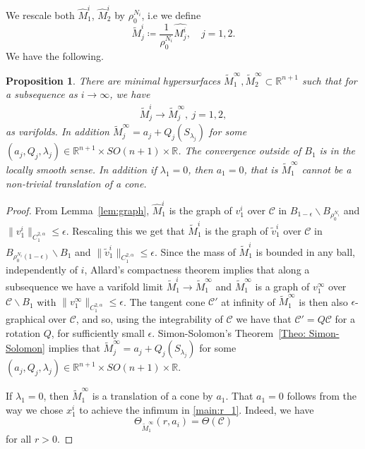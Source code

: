 \documentclass[12pt, reqno ]{amsart}
\newtheorem{prop}[theorem]{Proposition}
\numberwithin{equation}{section}
\begin{document}
We rescale both $\hat M_1^i$, $\hat M_2^i$ by $\rho_0^{N_i}$, i.e we define
$$ \widetilde M_j^i\coloneqq\frac{1}{\rho_0^{N_i}}\hat{M_j^i}, \quad j=1, 2. $$
We have the following. 
\begin{prop}\label{prop:Milimit} There are minimal hypersurfaces $\widetilde M_1^\infty, \widetilde M_2^\infty \subset \mathbb R^{n+1}$ such that for a subsequence as $i\to\infty$, we have
\begin{eqnarray*}
    \widetilde M_j^i \rightarrow \widetilde M_j^\infty, \: j=1, 2,
\end{eqnarray*}
as varifolds.
In addition $\widetilde M_j^\infty=a_j+Q_j(S_{\lambda_j})$ for some $ (a_j, Q_j, \lambda_j) \in \mathbb R^{n+1}\times SO(n+1)\times \mathbb R$.
The convergence outside of $B_1$ is in the locally smooth sense. In addition if $\lambda_1=0$, then $a_1=0$, that is $\widetilde M^\infty_1$ cannot be a non-trivial translation of a cone. 
\end{prop}
\begin{proof}
From Lemma~\ref{lem:graph}, $\hat M_1^i$ is the graph of $v_1^i$ over $\mathcal C$ in $B_{1-\epsilon}\backslash B_{\rho_0^{N_i}}$ and $\|v_1^i\|_{C^{2, \alpha}_1}\leq \epsilon $. Rescaling this we get that $\widetilde M_1^i$ is the graph of $\widetilde v_1^i$ over $\mathcal C$ in $B_{\rho_0^{N_i}(1-\epsilon)}\backslash B_1$ and $\|\widetilde v_1^i\|_{C^{2,\alpha}_1}\leq \epsilon$. Since the mass of $\widetilde M_1^i$ is bounded in any ball, independently of $i$, Allard's compactness theorem implies that along a subsequence we have a varifold limit $\widetilde M_1^i \rightarrow \widetilde M_1^\infty$ and $\widetilde M_1^\infty$ is a graph of $v_1^\infty$ over $\mathcal C\backslash B_1$ with $\|v_1^\infty\|_{C^{2, \alpha}_1}\leq \epsilon$.
The tangent cone $\mathcal{C}'$ at infinity of $\widetilde M_1^\infty$ is then also $\epsilon$-graphical over $\mathcal{C}$, and so, using the integrability of $\mathcal{C}$ we have that $\mathcal{C}' = Q\mathcal{C}$ for a rotation $Q$, for sufficiently small $\epsilon$. Simon-Solomon's Theorem~\ref{Theo: Simon-Solomon} implies that 
$\widetilde M_j^\infty=a_j+Q_j(S_{\lambda_j})$ for some $ (a_j, Q_j, \lambda_j) \in \mathbb R^{n+1}\times SO(n+1)\times \mathbb R$. 

If $\lambda_1=0$, then $\widetilde M^\infty_1$ is a translation of a cone by $a_1$. That $a_1=0$ follows from the way we chose $x^i_1$ to achieve the infimum in \eqref{main:r_1}. Indeed, we have
\[ \Theta_{\widetilde M^\infty_1}(r, a_i) = \Theta(\mathcal{C}) \]
for all $r > 0$. 
\end{proof}
\end{document}
